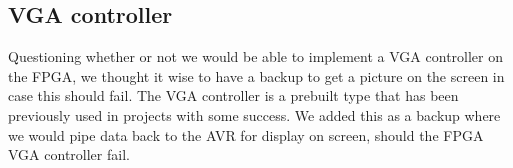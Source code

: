 \subsection{\ac{VGA} controller}

Questioning whether or not we would be able to implement a \ac{VGA} controller
on the \ac{FPGA}, we thought it wise to have a backup to get a picture on the
screen in case this should fail. The \ac{VGA} controller is a prebuilt type that
has been previously used in projects with some success. We added this as a
backup where we would pipe data back to the AVR for display on screen, should
the \ac{FPGA} \ac{VGA} controller fail.


